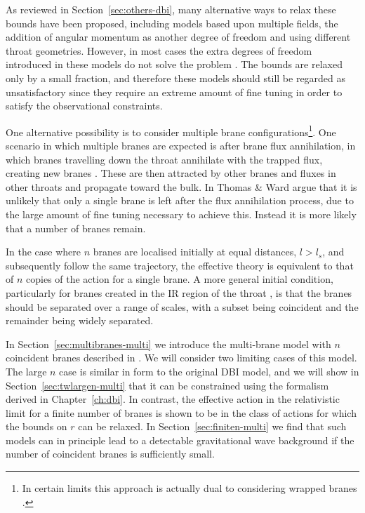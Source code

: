 As reviewed in Section~\ref{sec:others-dbi}, many alternative ways to relax these
bounds have been proposed, including
models based upon multiple fields, the addition of
angular momentum as another degree of freedom and using
different throat geometries. However, in most cases
the extra degrees of freedom introduced in these models do not solve the problem
\cite{Alabidi:2008ej}. The 
bounds are relaxed only by a small fraction, and therefore these models should still be 
regarded as unsatisfactory since they require an extreme amount of fine tuning in order
to satisfy the observational constraints.

One alternative possibility is to consider 
multiple brane configurations\footnote{In certain limits this approach 
is actually dual to considering wrapped branes \cite{Ward:2007gs}.}. 
One scenario in which multiple branes are expected is after brane flux annihilation, in which
branes travelling down the throat annihilate with the trapped flux, creating new branes
\cite{thomasward, DeWolfe:2004qx, Kachru:2002gs}. These are then attracted by other branes and
fluxes in other throats and propagate toward the bulk.
In  Thomas \& Ward argue that it is unlikely that only a single brane is left
after the flux annihilation process, due to the large amount of fine tuning necessary to achieve
this. Instead it is more likely that a number of branes remain.

In the case where  
$n$ branes are localised initially at equal distances, $l > l_s$, and 
subsequently follow the same trajectory, 
the effective theory is equivalent to that of $n$ copies of the
action for a single brane. A more general initial condition, particularly
for branes created in the IR region of the throat
\cite{brane13, DeWolfe:2004qx, Kachru:2002gs}, is that
the branes should be separated over a range of scales, 
with a subset being coincident and the remainder being widely separated. 


In Section~\ref{sec:multibranes-multi} we introduce the multi-brane
model with $n$ coincident branes described in . We will
consider two limiting cases of this model. The large $n$ case is similar in
form to the original DBI model, and we will show in
Section~\ref{sec:twlargen-multi} that it can be constrained using the
formalism derived in Chapter~\ref{ch:dbi}. In contrast, the effective action in the
relativistic limit for a finite number of
branes is shown to be in the
class of actions for which the bounds on $r$ can be relaxed.
In Section~\ref{sec:finiten-multi} we find that
such models 
can in principle lead to a detectable 
gravitational wave background if 
the number of coincident branes is sufficiently small. 






